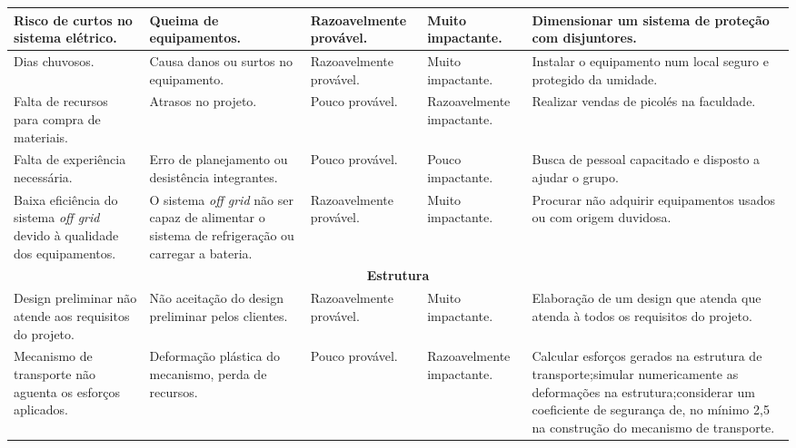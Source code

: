 \begin{longtable}{|m{2cm}|m{3cm}|m{2.8cm}|m{3cm}|m{4cm}|}
Risco de curtos no sistema elétrico.                                                      & Queima de equipamentos.                             & Razoavelmente provável. & Muito impactante.        & Dimensionar um sistema de proteção com disjuntores.                                                                                                         \\ \hline
 Dias chuvosos.      & Causa danos ou surtos no equipamento.                    & Razoavelmente provável. & Muito impactante.         & Instalar o equipamento num local seguro e protegido da umidade.             \\ \hline
Falta de recursos para compra de materiais. & Atrasos no projeto.                         & Pouco provável.         & Razoavelmente impactante.         & Realizar vendas de picolés na faculdade.                                    \\ \hline
 Falta de experiência necessária.              & Erro de planejamento ou desistência integrantes.                              & Pouco provável.         & Pouco impactante.         & Busca de pessoal capacitado e disposto a ajudar o grupo.                                                                                                            \\ \hline
Baixa eficiência do sistema \textit{off grid} devido à qualidade dos equipamentos.    & O sistema \textit{off grid} não ser capaz de alimentar o sistema de refrigeração ou carregar a bateria. & Razoavelmente provável. & Muito impactante.         &  Procurar não adquirir equipamentos usados ou com origem duvidosa.
\\ \hline
\multicolumn{5}{|c|}{\textbf{Estrutura}}\tabularnewline
\hline
Design preliminar não atende aos requisitos do projeto.                                        & Não aceitação do design preliminar pelos clientes.                      & Razoavelmente provável. & Muito impactante.         & Elaboração de um design que atenda que atenda à todos os requisitos do projeto.                                                                                                                                      \\ \hline
Mecanismo de transporte não aguenta os esforços aplicados.                                  & Deformação plástica do mecanismo, perda de recursos.             & Pouco provável.         & Razoavelmente impactante. & Calcular esforços gerados na estrutura de transporte;simular numericamente as deformações na estrutura;considerar um coeficiente de segurança de, no mínimo 2,5 na construção do mecanismo de transporte. \\ \hline

\end{longtable}
